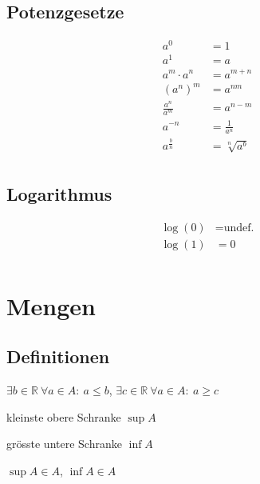 \documentclass[11pt]{article}
\begin{document}
\begin{minipage}[c]{0.5\textwidth}
\subsection{Potenzgesetze}

\begin{equation*}
\begin{split}
	a^0 & = 1 \\
	a^1 & = a \\
	a^m \cdot a^n & = a^{m+n} \\
	(a^n)^m & = a^{nm} \\
	\frac{a^n}{a^m} & = a^{n-m} \\
	a^{-n} & = \frac{1}{a^n} \\
	a^{\frac{b}{n}} & = \sqrt[n]	{a^b} \\
\end{split}
\end{equation*}
\end{minipage}
%
\begin{minipage}[c]{0.5\textwidth}
\subsection{Logarithmus}

\begin{equation*}
\begin{split}
	\log(0) & = \text{undef.} \\
	\log(1) & = 0 \\
\end{split}
\end{equation*}
\end{minipage}

\section{Mengen}

\subsection{Definitionen}

\begin{description}[labelindent=16pt,style=multiline,leftmargin=6cm, noitemsep]
	\item[Obere/Untere Schranke:] $\exists b \in \mathbb{R}\ \forall a\in A:\ a \leq b$, $\exists c \in \mathbb{R}\ \forall a\in A:\ a \geq c$
	\item[Supremum:] kleinste obere Schranke $\sup A$
	\item[Infimum:] gr{\"o}sste untere Schranke $\inf A$
	\item[Maximum/Minimum:] $\sup A \in A$, $\inf A \in A$
\end{description}
\end{document}
